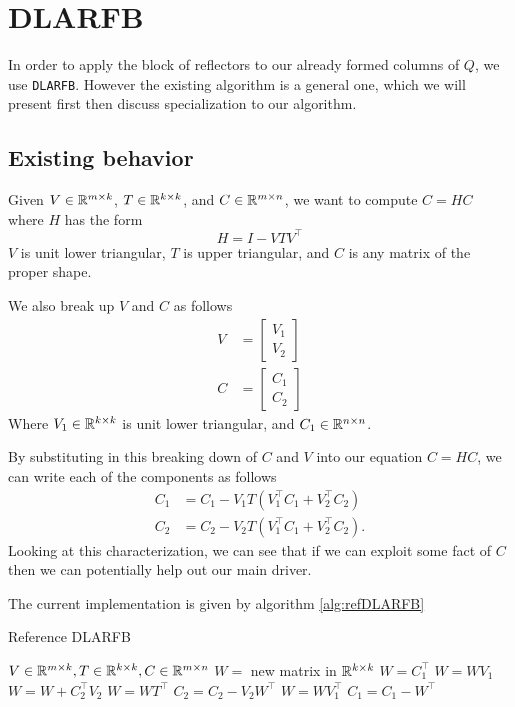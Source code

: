 \documentclass[12pt]{article}
\begin{document}
    \section{DLARFB}
    In order to apply the block of reflectors to our already formed columns of $Q$, we use \verb|DLARFB|.
    However the existing algorithm is a general one, which we will present first then discuss 
    specialization to our algorithm.
    \subsection{Existing behavior}
        Given $V\in\mathbb{R}^{m\times k}$, $T\in\mathbb{R}^{k\times k}$, and $C\in\mathbb{R}^{m\times n}$, we 
        want to compute $C = HC$ where $H$ has the form
        $$
        H = I - VTV^\top
        $$
        $V$ is unit lower triangular, $T$ is upper triangular, and $C$ is any matrix of the proper shape. 

        We also break up $V$ and $C$ as follows
        \begin{align}
            V &= \begin{bmatrix} V_1 \\ V_2 \end{bmatrix} \label{eq:vMatVert} \\
            C &= \begin{bmatrix} C_1 \\ C_2 \end{bmatrix} \label{eq:cMatVert}
        \end{align}
        Where $V_1\in\mathbb{R}^{k\times k}$ is unit lower triangular, and $C_1\in\mathbb{R}^{n\times n}$.

        By substituting in this breaking down of $C$ and $V$ into our equation $C = HC$, we can write each of the
        components as follows
        \begin{align*}
            C_1 &= C_1 - V_1T\left(V_1^\top C_1 + V_2^\top C_2\right) \\
            C_2 &= C_2 - V_2T\left(V_1^\top C_1 + V_2^\top C_2\right).
        \end{align*}
        Looking at this characterization, we can see that if we can exploit some fact of $C$ then we 
        can potentially help out our main driver.

        The current implementation is given by algorithm \ref{alg:refDLARFB}
        \begin{algorithm}
            \caption{Reference DLARFB}\label{alg:refDLARFB}
            \begin{algorithmic}[1]
                \REQUIRE $V\in\mathbb{R}^{m\times k}, T\in\mathbb{R}^{k\times k}, C\in\mathbb{R}^{m\times n}$
                \STATE $W = $ new matrix in $\mathbb{R}^{k\times k}$
                \STATE $W = C_1^\top$
                \STATE $W = WV_1$
                \STATE $W = W + C_2^\top V_2$
                \STATE $W = WT^\top$
                \STATE $C_2 = C_2 - V_2W^\top$
                \STATE $W = WV_1^\top$
                \STATE $C_1 = C_1 - W^\top$
            \end{algorithmic}
        \end{algorithm}
        
\end{document}
